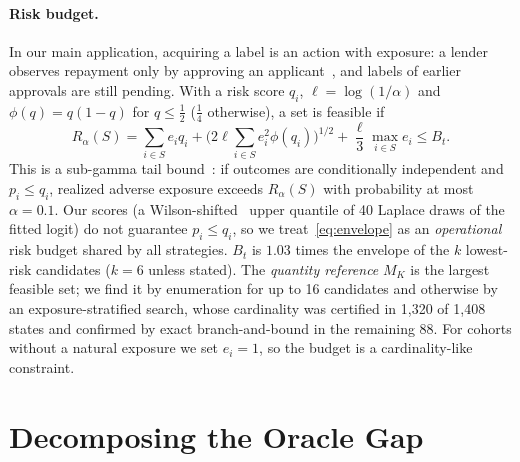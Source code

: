 \documentclass[runningheads]{llncs}
\begin{document}
\paragraph{Risk budget.} In our main application, acquiring a label is an action with exposure: a lender observes repayment only by approving an applicant~\cite{lakkaraju2017selective,wei2021selective}, and labels of earlier approvals are still pending. With a risk score $q_i$, $\ell=\log(1/\alpha)$ and $\phi(q)=q(1-q)$ for $q\le\frac12$ ($\frac14$ otherwise), a set is feasible if
\begin{equation}
 R_\alpha(S)=\sum_{i\in S}e_iq_i+\Big(2\ell\sum_{i\in S}e_i^2\phi(q_i)\Big)^{1/2}+\frac{\ell}{3}\max_{i\in S}e_i\le B_t .
 \label{eq:envelope}
\end{equation}
This is a sub-gamma tail bound~\cite{boucheron2013concentration}: if outcomes are conditionally independent and $p_i\le q_i$, realized adverse exposure exceeds $R_\alpha(S)$ with probability at most $\alpha=0.1$. Our scores (a Wilson-shifted~\cite{wilson1927probable} upper quantile of 40 Laplace draws of the fitted logit) do not guarantee $p_i\le q_i$, so we treat~\eqref{eq:envelope} as an \emph{operational} risk budget shared by all strategies. $B_t$ is $1.03$ times the envelope of the $k$ lowest-risk candidates ($k=6$ unless stated). The \emph{quantity reference} $M_K$ is the largest feasible set; we find it by enumeration for up to 16 candidates and otherwise by an exposure-stratified search, whose cardinality was certified in 1{,}320 of 1{,}408 states and confirmed by exact branch-and-bound in the remaining 88. For cohorts without a natural exposure we set $e_i=1$, so the budget is a cardinality-like constraint.

\section{Decomposing the Oracle Gap}
\label{sec:protocol}
\end{document}
